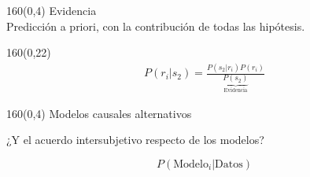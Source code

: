 \documentclass[shownotes,aspectratio=169]{beamer}
\begin{document}
\begin{frame}[plain]
\begin{textblock}{160}(0,4)
 \centering \LARGE Evidencia \\
 \Large Predicción a priori, con la contribución de todas las hipótesis.
 \end{textblock}
 \vspace{1cm}

  \begin{textblock}{160}(0,22)
  \begin{align*}
   P(r_i|s_2) = \frac{P(s_2|r_i)P(r_i)}{\underbrace{P(s_2)}_{\text{Evidencia}}}
  \end{align*}
 \end{textblock}



\end{frame}

\begin{frame}[plain]
\begin{textblock}{160}(0,4)
\centering \LARGE Modelos causales alternativos
\end{textblock}
 \vspace{1.25cm}

 \Large \centering

 ¿Y el acuerdo intersubjetivo respecto de los modelos?

 \pause

 \begin{equation*}
P(\text{Modelo}_i|\text{Datos})
 \end{equation*}

 \end{frame}
\end{document}
